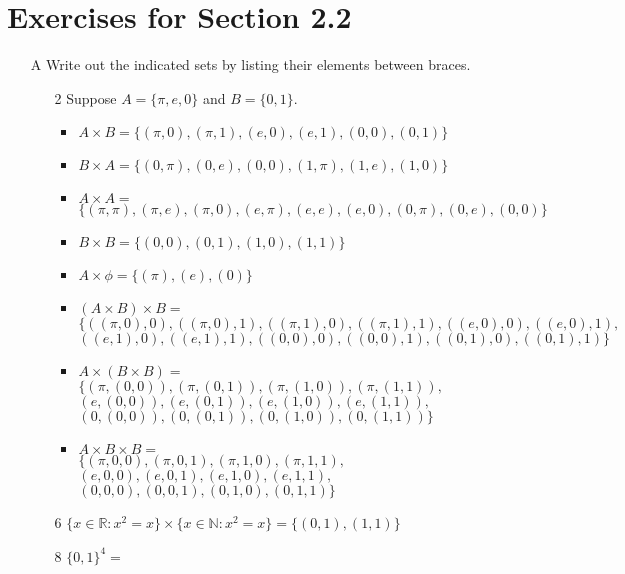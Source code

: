 \documentclass[12pt]{article}
\begin{document}
\section*{Exercises for Section 2.2}
\begin{itemize}
    \item [A] Write out the indicated sets by listing their elements between braces.
	\begin{itemize}
	    \item [2] Suppose $A=\{\pi, e, 0\}$ and $B=\{0,1\}$.
		\begin{itemize}
		    \item $A \times B = \{(\pi, 0), (\pi, 1), (e, 0), (e, 1), (0, 0), (0, 1)\}$
		    \item $B \times A = \{(0, \pi),(0, e), (0, 0), (1, \pi), (1, e), (1, 0)\}$
		    \item $A \times A = $\\
		    $\{(\pi, \pi), (\pi, e), (\pi, 0), (e, \pi), (e, e), (e, 0), (0, \pi), (0, e), (0, 0)\}$
		    \item $B \times B = \{ (0, 0), (0, 1), (1, 0), (1, 1)\}$
		    \item $A \times \phi = \{(\pi), (e), (0)\}$
		    \item $(A \times B) \times B = $\\
		    $\{((\pi, 0), 0), ((\pi, 0), 1), ((\pi, 1), 0), ((\pi, 1), 1), ((e, 0), 0), ((e, 0), 1),$\\
		    $((e, 1), 0), ((e, 1), 1), ((0, 0), 0), ((0, 0), 1), ((0, 1), 0), ((0, 1), 1)\}$
		    \item $A \times (B \times B) = $\\
		    $\{ (\pi,(0, 0)), (\pi, (0, 1)), (\pi, (1, 0)), (\pi,(1, 1)),$\\
		    $(e,(0, 0)), (e, (0, 1)), (e, (1, 0)), (e,(1, 1)),$\\
		    $(0,(0, 0)), (0, (0, 1)), (0, (1, 0)), (0,(1, 1))\}$
		    \item $A \times B \times B =$\\
			$\{(\pi, 0, 0), (\pi, 0, 1), (\pi, 1, 0), (\pi, 1, 1),$\\
			$(e, 0, 0), (e, 0, 1), (e, 1, 0), (e, 1, 1),$\\
			$(0, 0, 0), (0, 0, 1), (0, 1, 0), (0, 1, 1)\}$
		\end{itemize}
	    \item [6] $\{x \in \mathbb{R} : x^2 = x\} \times \{x \in \mathbb{N} : x^2 = x\} = \{(0, 1), (1, 1)\}$
	    \item [8] $\{0, 1 \}^4 =$\\

\end{itemize}
\end{itemize}
\end{document}
